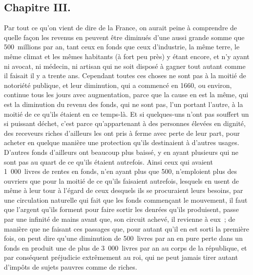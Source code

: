 \documentclass[french,twoside]{book} %
\begin{document}
\subsection[{Chapitre III.}]{Chapitre III.}
\noindent Par tout ce qu’on vient de dire de la France, on aurait peine à comprendre de quelle façon les revenus en peuvent être diminués d’une aussi grande somme que 500 millions par an, tant ceux en fonds que ceux d’industrie, la même terre, le même climat et les mêmes habitants (à fort peu près) y étant encore, et n’y ayant ni avocat, ni médecin, ni artisan qui ne soit disposé à gagner tout autant comme il faisait il y a trente ans. Cependant toutes ces choses ne sont pas à la moitié de notoriété publique, et leur diminution, qui a commencé en 1660, ou environ, continue tous les jours avec augmentation, parce que la cause en est la même, qui est la diminution du revenu des fonds, qui ne sont pas, l’un portant l’autre, à la moitié de ce qu’ils étaient en ce temps-là. Et si quelques-uns n’ont pas souffert un si puissant déchet, c’est parce qu’appartenant à des personnes élevées en dignité, des receveurs riches d’ailleurs les ont pris à ferme avec perte de leur part, pour acheter en quelque manière une protection qu’ils destinaient à d’autres usages. D’autres fonds d’ailleurs ont beaucoup plus baissé, y en ayant plusieurs qui ne sont pas au quart de ce qu’ils étaient autrefois. Ainsi ceux qui avaient 1 000 livres de rentes en fonds, n’en ayant plus que 500, n’emploient plus des ouvriers que pour la moitié de ce qu’ils faisaient autrefois, lesquels en usent de même à leur tour à l’égard de ceux desquels ils se procuraient leurs besoins, par une circulation naturelle qui fait que les fonds commençant le mouvement, il faut que l’argent qu’ils forment pour faire sortir les denrées qu’ils produisent, passe par une infinité de mains avant que, son circuit achevé, il revienne à eux ; de manière que ne faisant ces passages que, pour autant qu’il en est sorti la première fois, on peut dire qu’une diminution de 500 livres par an en pure perte dans un fonds en produit une de plus de 3 000 livres par an au corps de la république, et par conséquent préjudicie extrêmement au roi, qui ne peut jamais tirer autant d’impôts de sujets pauvres comme de riches.
\end{document}
